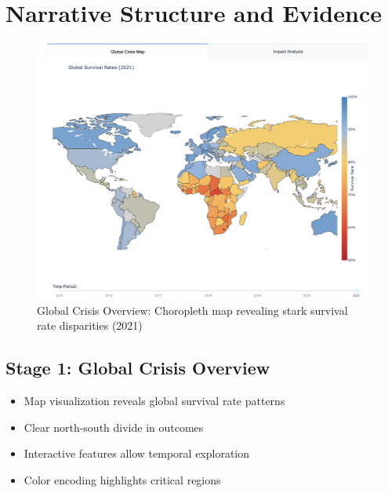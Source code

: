 \documentclass{article}
\begin{document}
\section{Narrative Structure and Evidence}
\begin{figure}[H]
    \centering
    \includegraphics[width=\textwidth]{Global_map.png}
    \caption{Global Crisis Overview: Choropleth map revealing stark survival rate disparities (2021)}
    \label{fig:global_map}
\end{figure}

\subsection{Stage 1: Global Crisis Overview}
\begin{itemize}
    \item Map visualization reveals global survival rate patterns
    \item Clear north-south divide in outcomes
    \item Interactive features allow temporal exploration
    \item Color encoding highlights critical regions
\end{itemize}
\end{document}
